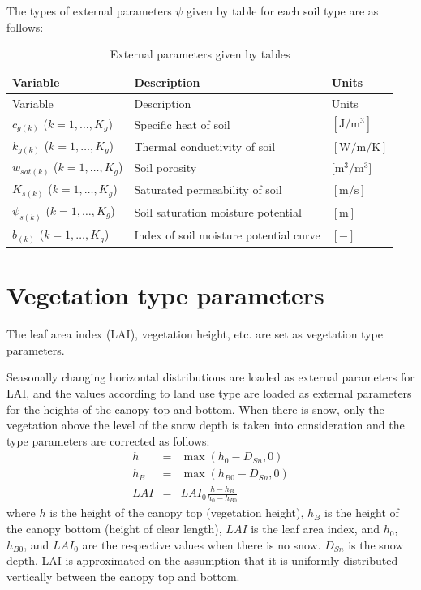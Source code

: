 The types of external parameters \(\psi\) given by table for each soil type are as follows:

\begin{longtable}[]{@{}lll@{}}
\caption{External parameters given by tables}\tabularnewline
\toprule\noalign{}
Variable & Description & Units \\
\midrule\noalign{}
\endfirsthead
\toprule\noalign{}
Variable & Description & Units \\
\midrule\noalign{}
\endhead
\bottomrule\noalign{}
\endlastfoot
\(c_{g(k)}\) (\(k=1,\ldots,K_g\)) & Specific heat of soil & \(\mathrm{[J/m^3]}\) \\
\(k_{g(k)}\) (\(k=1,\ldots,K_g\)) & Thermal conductivity of soil & \(\mathrm{[W/m/K]}\) \\
\(w_{sat(k)}\) (\(k=1,\ldots,K_g\)) & Soil porosity & {[}m\(^3\)/m\(^3\){]} \\
\(K_{s(k)}\) (\(k=1,\ldots,K_g\)) & Saturated permeability of soil & \(\mathrm{[m/s]}\) \\
\(\psi_{s(k)}\) (\(k=1,\ldots,K_g\)) & Soil saturation moisture potential & \(\mathrm{[m]}\) \\
\(b_{(k)}\) (\(k=1,\ldots,K_g\)) & Index of soil moisture potential curve & \(\mathrm{[-]}\) \\
\end{longtable}

\section{Vegetation type parameters}\label{vegetation-type-parameters}

The leaf area index (LAI), vegetation height, etc. are set as vegetation type parameters.

Seasonally changing horizontal distributions are loaded as external parameters for LAI, and the values according to land use type are loaded as external parameters for the heights of the canopy top
and bottom. When there is snow, only the vegetation above the level of the snow depth is taken into consideration and the type parameters are corrected as follows: \begin{eqnarray}
 h   &=& \max( h_0 - D_{Sn}, 0 ) \\
 h_B &=& \max( h_{B0} - D_{Sn}, 0 ) \\
 LAI &=& LAI_0 \frac{h-h_B}{h_0-h_{B0}}
\end{eqnarray} where \(h\) is the height of the canopy top (vegetation height), \(h_B\) is the height of the canopy bottom (height of clear length), \(LAI\) is the leaf area index, and \(h_0\), \(h_{B0}\), and
\(LAI_0\) are the respective values when there is no snow. \(D_{Sn}\) is the snow depth. LAI is approximated on the assumption that it is uniformly distributed vertically between the canopy top and
bottom.

